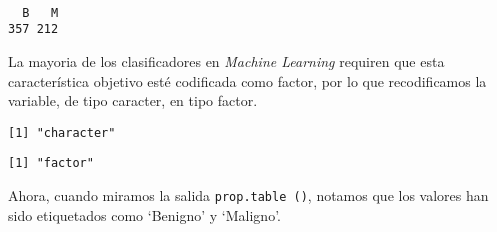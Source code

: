 \documentclass[
]{article}
\newenvironment{Shaded}{\begin{snugshade}}{\end{snugshade}}
\newcommand{\CommentTok}[1]{\textcolor[rgb]{0.56,0.35,0.01}{\textit{#1}}}
\newcommand{\DataTypeTok}[1]{\textcolor[rgb]{0.13,0.29,0.53}{#1}}
\newcommand{\DecValTok}[1]{\textcolor[rgb]{0.00,0.00,0.81}{#1}}
\newcommand{\KeywordTok}[1]{\textcolor[rgb]{0.13,0.29,0.53}{\textbf{#1}}}
\newcommand{\NormalTok}[1]{#1}
\newcommand{\OperatorTok}[1]{\textcolor[rgb]{0.81,0.36,0.00}{\textbf{#1}}}
\newcommand{\StringTok}[1]{\textcolor[rgb]{0.31,0.60,0.02}{#1}}
\begin{document}
\begin{verbatim}

  B   M 
357 212 
\end{verbatim}

La mayoria de los clasificadores en \emph{Machine Learning} requiren que
esta característica objetivo esté codificada como factor, por lo que
recodificamos la variable, de tipo caracter, en tipo factor.

\begin{Shaded}
\end{Shaded}

\begin{verbatim}
[1] "character"
\end{verbatim}

\begin{Shaded}
\end{Shaded}

\begin{verbatim}
[1] "factor"
\end{verbatim}

Ahora, cuando miramos la salida \texttt{prop.table\ ()}, notamos que los
valores han sido etiquetados como `Benigno' y `Maligno'.

\begin{Shaded}
\end{Shaded}
\end{document}
